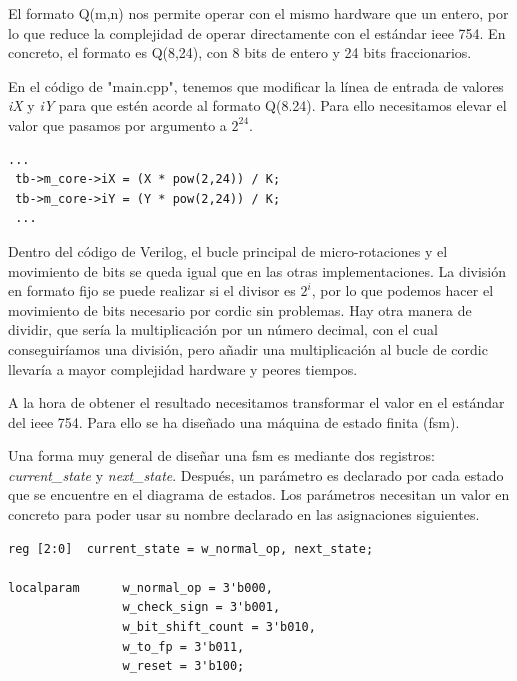 El formato Q(m,n) nos permite operar con el mismo hardware que un entero, por lo que reduce la complejidad de operar directamente con el estándar \gls{ieee} 754. En concreto, el formato es Q(8,24), con 8 bits de entero y 24 bits fraccionarios.

En el código de "main.cpp", tenemos que modificar la línea de entrada de valores \textit{iX} y \textit{iY} para que estén acorde al formato Q(8.24). Para ello necesitamos elevar el valor que pasamos por argumento a $2^{24}$.

\begin{lstlisting}[caption={Cambios de entrada de valores de C++ a Verilog en la implementación de Punto Flotante}]
 ...
 tb->m_core->iX = (X * pow(2,24)) / K;  
 tb->m_core->iY = (Y * pow(2,24)) / K;
 ...
\end{lstlisting}

Dentro del código de Verilog, el bucle principal de micro-rotaciones y el movimiento de bits se queda igual que en las otras implementaciones. La división en formato fijo se puede realizar si el divisor es $2^i$, por lo que podemos hacer el movimiento de bits necesario por \gls{cordic} sin problemas. Hay otra manera de dividir, que sería la multiplicación por un número decimal, con el cual conseguiríamos una división, pero añadir una multiplicación al bucle de \gls{cordic} llevaría a mayor complejidad hardware y peores tiempos.

A la hora de obtener el resultado necesitamos transformar el valor en el estándar del \gls{ieee} 754. Para ello se ha diseñado una máquina de estado finita (\gls{fsm}).

Una forma muy general de diseñar una \gls{fsm} es mediante dos registros: \textit{current\_state} y \textit{next\_state}. Después, un parámetro es declarado por cada estado que se encuentre en el diagrama de estados. Los parámetros necesitan un valor en concreto para poder usar su nombre declarado en las asignaciones siguientes.

\begin{lstlisting}[caption={Registros para controlar los estádos y parámetros locales de estado para controlar la máquina de estado finita.}]
reg [2:0]  current_state = w_normal_op, next_state;

localparam      w_normal_op = 3'b000,
                w_check_sign = 3'b001,
                w_bit_shift_count = 3'b010,
                w_to_fp = 3'b011,
                w_reset = 3'b100;

\end{lstlisting}

